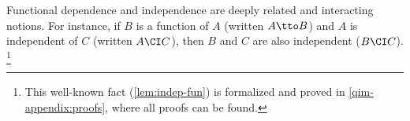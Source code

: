 Functional dependence and independence 
%
are deeply related and interacting notions.
For instance,
    if $B$ is a function of $A$ (written $A \tto B$) and $A$ is independent of $C$ (written $A \CI C$), then $B$ and $C$ are also independent ($B \CI C$).
\unskip\footnote{This well-known fact (\cref{lem:indep-fun}) is formalized
    and proved in \cref{qim-appendix:proofs},
    where all proofs can be found.}

